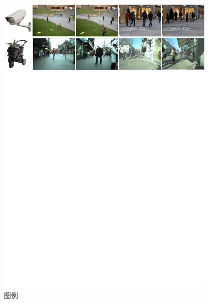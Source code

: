\begin{figure}[!t]
	\centering
	\includegraphics[width=0.95\textwidth]{./imgs/scenes}
	\caption{图例}
	\label{fig:scenes}
\end{figure}